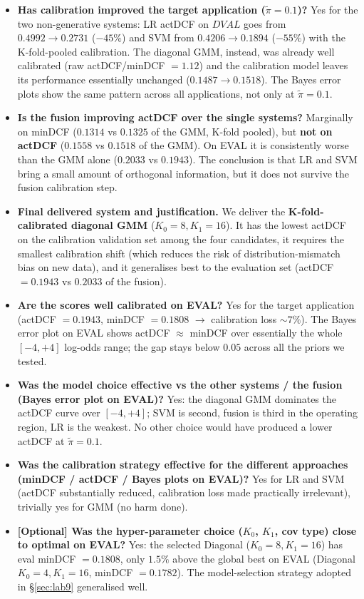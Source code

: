 \documentclass[11pt,a4paper]{article}
\begin{document}
\begin{itemize}
\item \textbf{Has calibration improved the target application
      ($\tilde{\pi}=0.1$)?} Yes for the two non-generative systems:
      LR actDCF on $\mathit{DVAL}$ goes from $0.4992 \to 0.2731$
      ($-45\%$) and SVM from $0.4206 \to 0.1894$ ($-55\%$) with the
      K-fold-pooled calibration. The diagonal GMM, instead, was
      already well calibrated (raw actDCF/minDCF $=1.12$) and the
      calibration model leaves its performance essentially unchanged
      ($0.1487 \to 0.1518$). The Bayes error plots show the same
      pattern across all applications, not only at $\tilde{\pi}=0.1$.
\item \textbf{Is the fusion improving actDCF over the single
      systems?} Marginally on minDCF ($0.1314$ vs $0.1325$ of the
      GMM, K-fold pooled), but \textbf{not on actDCF} ($0.1558$ vs
      $0.1518$ of the GMM). On EVAL it is consistently worse than
      the GMM alone ($0.2033$ vs $0.1943$). The conclusion is that
      LR and SVM bring a small amount of orthogonal information,
      but it does not survive the fusion calibration step.
\item \textbf{Final delivered system and justification.} We deliver
      the \textbf{K-fold-calibrated diagonal GMM} ($K_0=8, K_1=16$).
      It has the lowest actDCF on the calibration validation set
      among the four candidates, it requires the smallest
      calibration shift (which reduces the risk of
      distribution-mismatch bias on new data), and it generalises
      best to the evaluation set (actDCF $= 0.1943$ vs $0.2033$ of
      the fusion).
\item \textbf{Are the scores well calibrated on EVAL?} Yes for the
      target application (actDCF $=0.1943$, minDCF $=0.1808$
      $\rightarrow$ calibration loss $\sim 7\%$). The Bayes error
      plot on EVAL shows actDCF $\approx$ minDCF over essentially
      the whole $[-4, +4]$ log-odds range; the gap stays below
      $0.05$ across all the priors we tested.
\item \textbf{Was the model choice effective vs the other systems /
      the fusion (Bayes error plot on EVAL)?} Yes: the diagonal GMM
      dominates the actDCF curve over $[-4, +4]$; SVM is second,
      fusion is third in the operating region, LR is the weakest.
      No other choice would have produced a lower actDCF at
      $\tilde{\pi}=0.1$.
\item \textbf{Was the calibration strategy effective for the
      different approaches (minDCF / actDCF / Bayes plots on EVAL)?}
      Yes for LR and SVM (actDCF substantially reduced, calibration
      loss made practically irrelevant), trivially yes for GMM
      (no harm done).
\item \textbf{[Optional] Was the hyper-parameter choice
      ($K_0$, $K_1$, cov type) close to optimal on EVAL?} Yes: the
      selected Diagonal ($K_0=8, K_1=16$) has eval
      minDCF $=0.1808$, only $1.5\%$ above the global best on EVAL
      (Diagonal $K_0=4, K_1=16$, minDCF $=0.1782$). The
      model-selection strategy adopted in \S\ref{sec:lab9}
      generalised well.
\end{itemize}
\end{document}
